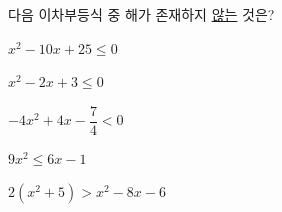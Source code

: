\hspace*{2mm}\begin{minipage}[t]{\dimexpr\linewidth-2mm\relax}\vspace{0pt}
다음 이차부등식 중 해가 존재하지 \underline{않는} 것은?
\begin{choicesv}{\rule[-3ex]{0pt}{8ex}$x^2-10x+25\le 0$}{\rule[-3ex]{0pt}{8ex}$x^2-2x+3\le 0$}{\rule[-3ex]{0pt}{8ex}$-4x^2+4x-\dfrac{7}{4}<0$}{\rule[-3ex]{0pt}{8ex}$9x^2\le 6x-1$}{\rule[-3ex]{0pt}{8ex}$2(x^2+5)>x^2-8x-6$}\end{choicesv}\end{minipage}
